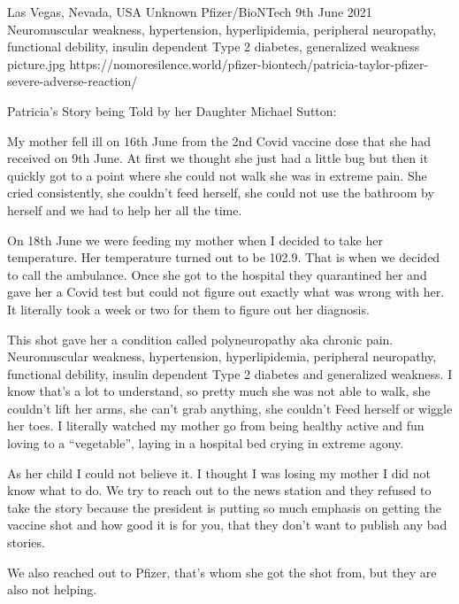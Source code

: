 {Las Vegas, Nevada, USA}
{Unknown}
{Pfizer/BioNTech}
{9th June 2021}
{Neuromuscular weakness, hypertension, hyperlipidemia, peripheral neuropathy, functional debility, insulin dependent Type 2 diabetes, generalized weakness}
{picture.jpg}
{https://nomoresilence.world/pfizer-biontech/patricia-taylor-pfizer-severe-adverse-reaction/}
{


Patricia’s Story being Told by her Daughter Michael Sutton:

My mother fell ill on 16th June from the 2nd Covid vaccine dose that she had received on 9th June. At first we thought she just had a little bug but then it quickly got to a point where she could not walk she was in extreme pain. She cried consistently, she couldn’t feed herself, she could not use the bathroom by herself and we had to help her all the time.


On 18th June we were feeding my mother when I decided to take her temperature. Her temperature turned out to be 102.9. That is when we decided to call the ambulance. Once she got to the hospital they quarantined her and gave her a Covid test but could not figure out exactly what was wrong with her. It literally took a week or two for them to figure out her diagnosis.

This shot gave her a condition called polyneuropathy aka chronic pain. Neuromuscular weakness, hypertension, hyperlipidemia, peripheral neuropathy, functional debility, insulin dependent Type 2 diabetes and generalized weakness. I know that’s a lot to understand, so pretty much she was not able to walk, she couldn’t lift her arms, she can’t grab anything, she couldn’t Feed herself or wiggle her toes. I literally watched my mother go from being healthy active and fun loving to a “vegetable”, laying in a hospital bed crying in extreme agony.

As her child I could not believe it. I thought I was losing my mother I did not know what to do. We try to reach out to the news station and they refused to take the story because the president is putting so much emphasis on getting the vaccine shot and how good it is for you, that they don’t want to publish any bad stories.

We also reached out to Pfizer, that’s whom she got the shot from, but they are also not helping.
}
